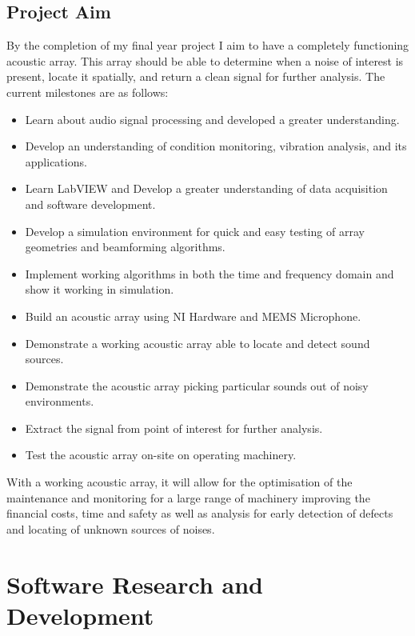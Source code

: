 \documentclass{UoNMCHA}
\numberwithin{equation}{section}
\begin{document}
\subsection{Project Aim} \label{sec:Project  Aim}
    By the completion of my final year project I aim to have a completely functioning acoustic array. This array should be able to determine when a noise of interest is present, locate it spatially, and return a clean signal for further analysis. The current milestones are as follows:
    
    \begin{itemize}
        \item Learn about audio signal processing and developed a greater understanding.
        \item Develop an understanding of condition monitoring, vibration analysis, and its applications.
        \item Learn LabVIEW and Develop a greater understanding of data acquisition and software development.
        \item Develop a simulation environment for quick and easy testing of array geometries and beamforming algorithms.
        \item Implement working algorithms in both the time and frequency domain and show it working in simulation.
        \item Build an acoustic array using NI Hardware and MEMS Microphone.
        \item Demonstrate a working acoustic array able to locate and detect sound sources.
        \item Demonstrate the acoustic array picking particular sounds out of noisy environments.
        \item Extract the signal from point of interest for further analysis.
        \item Test the acoustic array on-site on operating machinery.
    \end{itemize}
    
    With a working acoustic array, it will allow for the optimisation of the maintenance and monitoring for a large range of machinery improving the financial costs, time and safety as well as analysis for early detection of defects and locating of unknown sources of noises.
\newpage
\section{Software Research and Development} \label{sec:Software}
\end{document}
